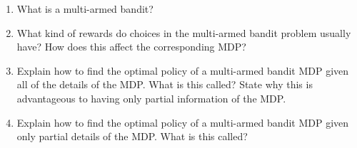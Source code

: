 \documentclass[]{article}
\begin{document}
\begin{enumerate}[resume*]
\item What is a multi-armed bandit?
\item What kind of rewards do choices in the multi-armed bandit problem usually have? How does this affect the corresponding MDP?
\item Explain how to find the optimal policy of a multi-armed bandit MDP given all of the details of the MDP. What is this called? State why this is advantageous to having only partial information of the MDP.
\item Explain how to find the optimal policy of a multi-armed bandit MDP given only partial details of the MDP. What is this called?




\end{enumerate}
\end{document}
